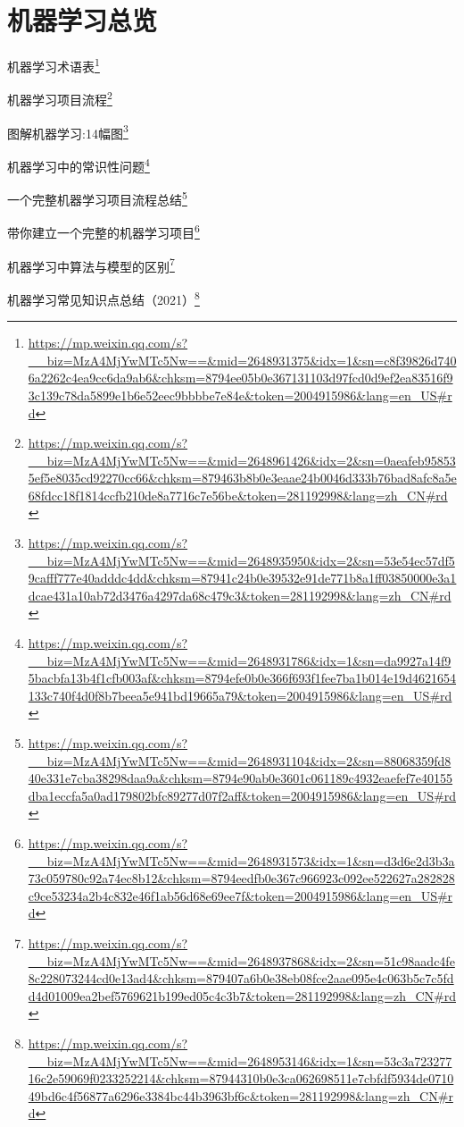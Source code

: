 \documentclass[]{ctexbook}
\renewcommand{\href}[2]{#2\footnote{\url{#1}}}
\begin{document}
\hypertarget{ux673aux5668ux5b66ux4e60ux603bux89c8}{%
\section{机器学习总览}\label{ux673aux5668ux5b66ux4e60ux603bux89c8}}

\href{https://mp.weixin.qq.com/s?__biz=MzA4MjYwMTc5Nw==\&mid=2648931375\&idx=1\&sn=c8f39826d7406a2262c4ea9cc6da9ab6\&chksm=8794ee05b0e367131103d97fcd0d9ef2ea83516f93c139c78da5899e1b6e52eec9bbbbe7e84e\&token=2004915986\&lang=en_US\#rd}{机器学习术语表}

\href{https://mp.weixin.qq.com/s?__biz=MzA4MjYwMTc5Nw==\&mid=2648961426\&idx=2\&sn=0aeafeb958535ef5e8035cd92270cc66\&chksm=879463b8b0e3eaae24b0046d333b76bad8afc8a5e68fdcc18f1814ccfb210de8a7716c7e56be\&token=281192998\&lang=zh_CN\#rd}{机器学习项目流程}

\href{https://mp.weixin.qq.com/s?__biz=MzA4MjYwMTc5Nw==\&mid=2648935950\&idx=2\&sn=53e54ec57df59cafff777e40adddc4dd\&chksm=87941c24b0e39532e91de771b8a1ff03850000e3a1dcae431a10ab72d3476a4297da68c479c3\&token=281192998\&lang=zh_CN\#rd}{图解机器学习:14幅图}

\href{https://mp.weixin.qq.com/s?__biz=MzA4MjYwMTc5Nw==\&mid=2648931786\&idx=1\&sn=da9927a14f95bacbfa13b4f1cfb003af\&chksm=8794efe0b0e366f693f1fee7ba1b014e19d4621654133c740f4d0f8b7beea5e941bd19665a79\&token=2004915986\&lang=en_US\#rd}{机器学习中的常识性问题}

\href{https://mp.weixin.qq.com/s?__biz=MzA4MjYwMTc5Nw==\&mid=2648931104\&idx=2\&sn=88068359fd840e331e7cba38298daa9a\&chksm=8794e90ab0e3601c061189c4932eaefef7e40155dba1eccfa5a0ad179802bfc89277d07f2aff\&token=2004915986\&lang=en_US\#rd}{一个完整机器学习项目流程总结}

\href{https://mp.weixin.qq.com/s?__biz=MzA4MjYwMTc5Nw==\&mid=2648931573\&idx=1\&sn=d3d6e2d3b3a73c059780c92a74ec8b12\&chksm=8794eedfb0e367c966923c092ee522627a282828c9ce53234a2b4c832e46f1ab56d68e69ee7f\&token=2004915986\&lang=en_US\#rd}{带你建立一个完整的机器学习项目}

\href{https://mp.weixin.qq.com/s?__biz=MzA4MjYwMTc5Nw==\&mid=2648937868\&idx=2\&sn=51c98aadc4fe8c228073244cd0e13ad4\&chksm=879407a6b0e38eb08fce2aae095e4c063b5c7c5fdd4d01009ea2bef5769621b199ed05c4c3b7\&token=281192998\&lang=zh_CN\#rd}{机器学习中算法与模型的区别}

\href{https://mp.weixin.qq.com/s?__biz=MzA4MjYwMTc5Nw==\&mid=2648953146\&idx=1\&sn=53c3a72327716c2e59069f0233252214\&chksm=87944310b0e3ca062698511e7cbfdf5934de071049bd6c4f56877a6296e3384bc44b3963bf6c\&token=281192998\&lang=zh_CN\#rd}{机器学习常见知识点总结（2021）}
\end{document}
